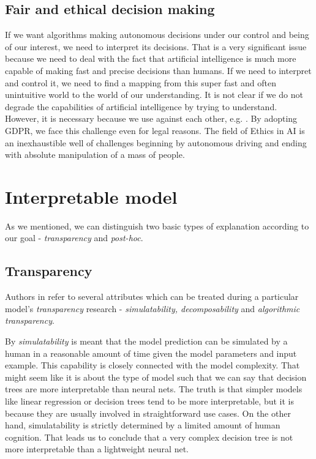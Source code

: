\subsection{Fair and ethical decision making}
If we want algorithms making autonomous decisions under our control and being of our interest, we need to interpret its decisions. That is a very significant issue because we need to deal with the fact that artificial intelligence is much more capable of making fast and precise decisions than humans. If we need to interpret and control it, we need to find a mapping from this super fast and often unintuitive world to the world of our understanding. It is not clear if we do not degrade the capabilities of artificial intelligence by trying to understand. However, it is necessary because we use against each other, e.g. \cite{Boldyreva2018}. By adopting GDPR, we face this challenge even for legal reasons. The field of Ethics in AI \cite{Siau2020} is an inexhaustible well of challenges beginning by autonomous driving and ending with absolute manipulation of a mass of people.

\section{Interpretable model}
As we mentioned, we can distinguish two basic types of explanation according to our goal - \emph{transparency} and \emph{post-hoc}.

\subsection{Transparency}
Authors in \cite{Lipton2016} refer to several attributes which can be treated during a particular model's \emph{transparency} research - \emph{simulatability, decomposability} and \emph{algorithmic transparency}.

By \emph{simulatability} is meant that the model prediction can be simulated by a human in a reasonable amount of time given the model parameters and input example. This capability is closely connected with the model complexity. That might seem like it is about the type of model such that we can say that decision trees are more interpretable than neural nets. The truth is that simpler models like linear regression or decision trees tend to be more interpretable, but it is because they are usually involved in straightforward use cases. On the other hand, simulatability is strictly determined by a limited amount of human cognition. That leads us to conclude that a very complex decision tree is not more interpretable than a lightweight neural net.


